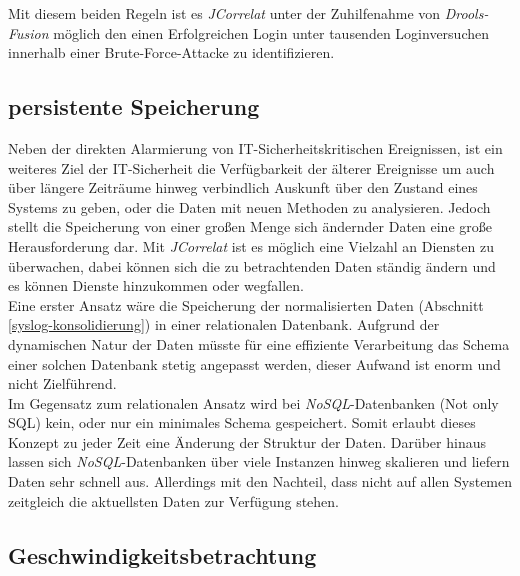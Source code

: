 Mit diesem beiden Regeln ist es \textit{JCorrelat} unter der Zuhilfenahme von 
\textit{Drools-Fusion} möglich den einen Erfolgreichen Login unter tausenden 
Loginversuchen innerhalb einer Brute-Force-Attacke zu identifizieren.

\subsection{persistente Speicherung}\label{nosql}

Neben der direkten Alarmierung von IT-Sicherheitskritischen Ereignissen, ist ein weiteres 
Ziel der IT-Sicherheit die Verfügbarkeit der älterer Ereignisse um auch über längere 
Zeiträume hinweg verbindlich Auskunft über den Zustand eines Systems zu geben, oder die 
Daten mit neuen Methoden zu analysieren. Jedoch stellt die Speicherung von einer großen 
Menge sich ändernder Daten eine große Herausforderung dar. Mit \textit{JCorrelat} ist es 
möglich eine Vielzahl an Diensten zu überwachen, dabei können sich die zu betrachtenden 
Daten ständig ändern und es können Dienste hinzukommen oder wegfallen.\\

Eine erster Ansatz wäre die Speicherung der normalisierten Daten (Abschnitt 
\ref{syslog-konsolidierung}) in einer relationalen Datenbank. Aufgrund der dynamischen 
Natur der Daten müsste für eine effiziente Verarbeitung das Schema einer solchen 
Datenbank stetig angepasst werden, dieser Aufwand ist enorm und nicht Zielführend.\\
Im Gegensatz zum relationalen Ansatz wird bei \textit{NoSQL}-Datenbanken (Not only SQL) 
kein, oder nur ein minimales Schema gespeichert. Somit erlaubt dieses Konzept zu jeder 
Zeit eine Änderung der Struktur der Daten. Darüber hinaus lassen sich 
\textit{NoSQL}-Datenbanken über viele Instanzen hinweg skalieren und liefern Daten sehr 
schnell aus. Allerdings mit den Nachteil, dass nicht auf allen Systemen zeitgleich die 
aktuellsten Daten zur Verfügung stehen.




\subsection{Geschwindigkeitsbetrachtung}\label{performance}